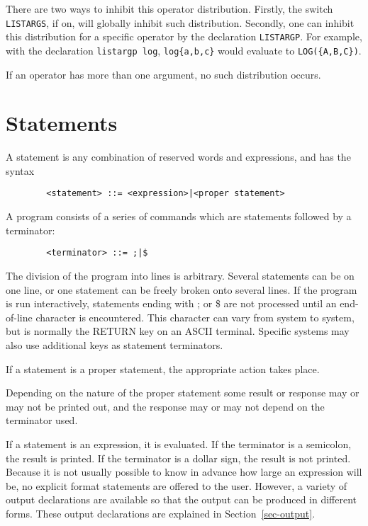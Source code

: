 There are two ways to inhibit this operator distribution.  Firstly, the
switch {\tt LISTARGS},  if on, will globally inhibit
such distribution.  Secondly, one can inhibit this distribution for a
specific operator by the declaration {\tt LISTARGP}. For
example, with the declaration {\tt listargp log}, {\tt log\{a,b,c\}} would
evaluate to {\tt LOG(\{A,B,C\})}.

If an operator has more than one argument, no such distribution occurs.

\chapter{Statements}

A statement is any combination of reserved words and
expressions, and has the syntax 
\begin{verbatim}
        <statement> ::= <expression>|<proper statement>
\end{verbatim}
A {\REDUCE} program consists of a series of commands which are statements
followed by a terminator:
\begin{verbatim}
        <terminator> ::= ;|$
\end{verbatim}
The division of the program into lines is arbitrary. Several statements
can be on one line, or one statement can be freely broken onto several
lines. If the program is run interactively, statements ending with ; or \$
are not processed until an end-of-line character is encountered. This
character can vary from system to system, but is normally the RETURN key on
an ASCII terminal. Specific systems may also use additional keys as
statement terminators.

If a statement is a proper statement, the
appropriate action takes place.

Depending on the nature of the proper statement some result or response may
or may not be printed out, and the response may or may not depend on the
terminator used.

If a statement is an expression, it is evaluated. If the terminator is a
semicolon, the result is printed. If the terminator is a dollar sign, the
result is not printed. Because it is not usually possible to know in
advance how large an expression will be, no explicit format statements are
offered to the user. However, a variety of output declarations are
available so that the output can be produced in different forms. These
output declarations are explained in Section~\ref{sec-output}.

